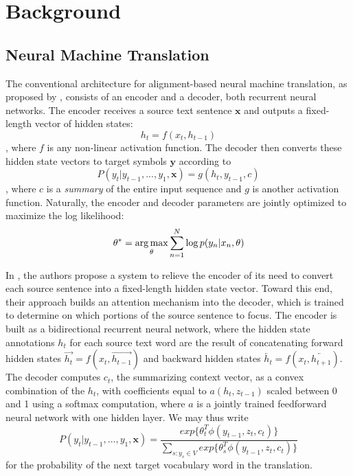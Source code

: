 \section{Background}
\label{sec:background}

\subsection{Neural Machine Translation}
The conventional architecture for alignment-based neural machine translation, as proposed by ,
consists of an encoder and a decoder, both recurrent neural networks. The encoder receives
a source text sentence $\mathbf{x}$ and outputs a fixed-length vector of hidden states:
\begin{equation}
h_{t} = f(x_{t}, h_{t-1})
\end{equation},
where $f$ is any non-linear activation function. The decoder then converts these hidden state vectors to
target symbols $\mathbf{y}$ according to
\begin{equation}
P(y_{t} | y_{t-1}, ..., y_{1}, \mathbf{x}) = g(h_{t}, y_{t-1}, c)
\end{equation},
where $c$ is a \emph{summary} of the entire input sequence and $g$ is another activation function.
Naturally, the encoder and decoder parameters are jointly optimized to maximize the log likelihood:
\begin{equation}
\theta^{*} = \operatorname*{arg\,max}_{\theta} \sum_{n=1}^{N}\log p(y_{n} | x_{n}, \theta)
\end{equation}

In , the authors propose a system to relieve the encoder of its need
to convert each source sentence into a fixed-length hidden state vector. Toward this end, their approach builds an attention mechanism
into the decoder, which is trained to determine on which portions of the source sentence to focus. The encoder
is built as a bidirectional recurrent neural network, where the hidden state annotations $h_{t}$ for each source text word
are the result of concatenating forward hidden states $\overrightarrow{h_{t}} = f(x_{t}, \overrightarrow{h_{t-1}})$ and backward hidden states
$\overleftarrow{h_{t}} = f(x_{t}, \overleftarrow{h_{t+1}})$. The decoder computes $c_{t}$, the summarizing context vector,
as a convex combination of the $h_{t}$, with coefficients equal to $a(h_{t}, z_{t-1})$ scaled between 0 and 1 using a softmax computation, where $a$ is a
jointly trained feedforward neural network with one hidden layer. We may thus write
\begin{equation}
P(y_{t} | y_{t-1}, ..., y_{1}, \mathbf{x}) = \dfrac{exp\{\theta_{t}^{T} \phi(y_{t-1}, z_{t}, c_{t})\}}{\displaystyle\sum_{s:y_{s} \in V} exp\{\theta_{s}^{T} \phi(y_{t-1}, z_{t}, c_{t})\}}
\end{equation}
for the probability of the next target vocabulary word in the translation.\\

